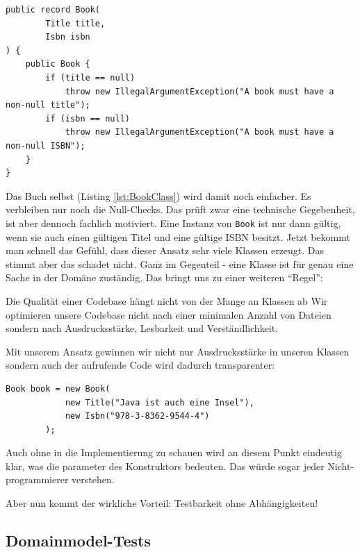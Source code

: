 \begin{listing}[H]
\begin{verbatim}
public record Book(
        Title title,
        Isbn isbn
) {
    public Book {
        if (title == null)
            throw new IllegalArgumentException("A book must have a non-null title");
        if (isbn == null)
            throw new IllegalArgumentException("A book must have a non-null ISBN");
    }
}
\end{verbatim}
\caption{Book.java}
\label{lst:BookClass}
\end{listing}

Das Buch selbst (Listing \ref{lst:BookClass}) wird damit noch einfacher. 
Es verbleiben nur noch die Null-Checks. Das prüft zwar eine technische
Gegebenheit, ist aber dennoch fachlich motiviert. Eine Instanz von 
\texttt{Book} ist nur dann gültig, wenn sie auch einen
gültigen Titel und eine gültige ISBN besitzt. Jetzt bekommt man schnell
das Gefühl, dass dieser Ansatz sehr viele Klassen erzeugt. Das stimmt aber
das schadet nicht. Ganz im Gegenteil - eine Klasse ist für genau eine
Sache in der Domäne zuständig. Das bringt uns zu einer
weiteren ``Regel'':

\begin{rulebox}[label=rule:numberOfClasses]{Die Qualität einer Codebase
    hängt nicht von der Mange an Klassen ab}
Wir optimieren unsere Codebase nicht nach einer minimalen Anzahl von 
Dateien sondern nach Ausdrucksstärke, Lesbarkeit und Verständlichkeit.
\end{rulebox}

Mit unserem Ansatz gewinnen wir nicht nur Ausdrucksstärke in unseren 
Klassen sondern auch der aufrufende Code wird dadurch transparenter:

\begin{listing}[H]
\begin{verbatim}
Book book = new Book(
            new Title("Java ist auch eine Insel"),
            new Isbn("978-3-8362-9544-4")
        );
\end{verbatim}
\caption{Codeschnipsel zur Instanziierung eines \texttt{Book}-Objekts}
\label{lst:createBookSnipped}
\end{listing}

Auch ohne in die Implementierung zu schauen wird an diesem Punkt eindeutig
klar, was die parameter des Konstruktors bedeuten. Das würde sogar jeder
Nicht-programmierer verstehen.

Aber nun kommt der wirkliche Vorteil: Testbarkeit ohne Abhängigkeiten!
\subsection{Domainmodel-Tests}

